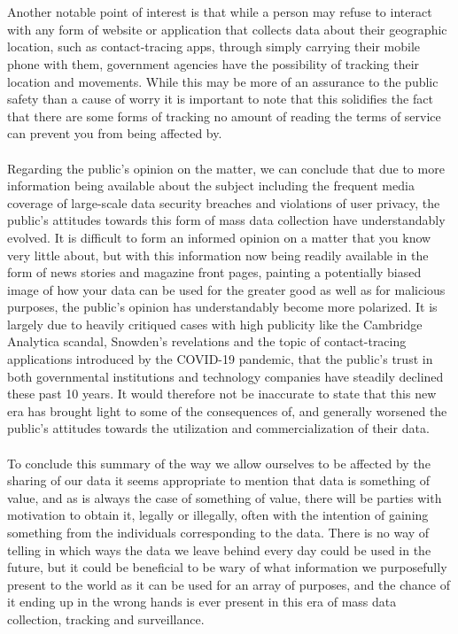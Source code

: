 \documentclass[11pt]{article}
\begin{document}
\\ \\
Another notable point of interest is that while a person may refuse to interact with any form of website or application that collects data about their geographic location, such as contact-tracing apps, through simply carrying their mobile phone with them, government agencies have the possibility of tracking their location and movements. While this may be more of an assurance to the public safety than a cause of worry it is important to note that this solidifies the fact that there are some forms of tracking no amount of reading the terms of service can prevent you from being affected by.
\\ \\
Regarding the public’s opinion on the matter, we can conclude that due to more information being available about the subject including the frequent media coverage of large-scale data security breaches and violations of user privacy, the public’s attitudes towards this form of mass data collection have understandably evolved. It is difficult to form an informed opinion on a matter that you know very little about, but with this information now being readily available in the form of news stories and magazine front pages, painting a potentially biased image of how your data can be used for the greater good as well as for malicious purposes, the public’s opinion has understandably become more polarized. It is largely due to heavily critiqued cases with high publicity like the Cambridge Analytica scandal, Snowden’s revelations and the topic of contact-tracing applications introduced by the COVID-19 pandemic, that the public’s trust in both governmental institutions and technology companies have steadily declined these past 10 years. It would therefore not be inaccurate to state that this new era has brought light to some of the consequences of, and generally worsened the public’s attitudes towards the utilization and commercialization of their data.
\\ \\
To conclude this summary of the way we allow ourselves to be affected by the sharing of our data it seems appropriate to mention that data is something of value, and as is always the case of something of value, there will be parties with motivation to obtain it, legally or illegally, often with the intention of gaining something from the individuals corresponding to the data. There is no way of telling in which ways the data we leave behind every day could be used in the future, but it could be beneficial to be wary of what information we purposefully present to the world as it can be used for an array of purposes, and the chance of it ending up in the wrong hands is ever present in this era of mass data collection, tracking and surveillance.
\\
\end{document}
